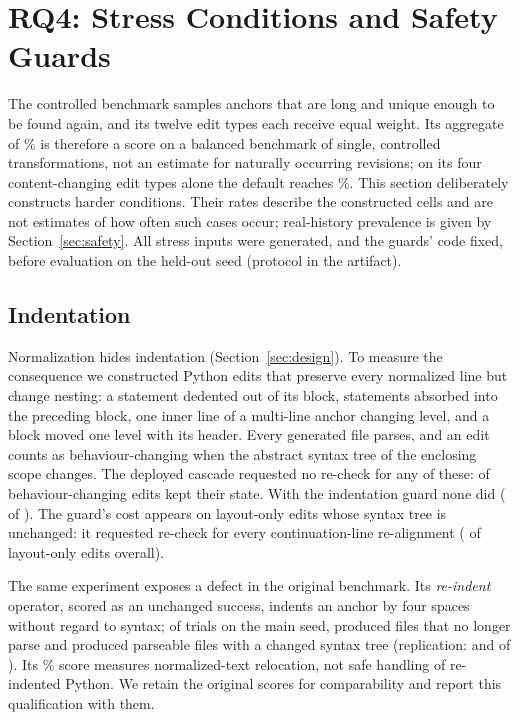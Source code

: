 \section{RQ4: Stress Conditions and Safety Guards}\label{sec:stress}
The controlled benchmark samples anchors that are long and unique enough to be found again, and its twelve edit types each receive equal weight. Its aggregate of \smCtlCasAccPct\% is therefore a score on a balanced benchmark of single, controlled transformations, not an estimate for naturally occurring revisions; on its four content-changing edit types alone the default reaches \ctlChangedAccPct\%. This section deliberately constructs harder conditions. Their rates describe the constructed cells and are not estimates of how often such cases occur; real-history prevalence is given by Section~\ref{sec:safety}. All stress inputs were generated, and the guards' code fixed, before evaluation on the held-out seed (protocol in the artifact).

\subsection{Indentation}
Normalization hides indentation (Section~\ref{sec:design}). To measure the consequence we constructed Python edits that preserve every normalized line but change nesting: a statement dedented out of its block, statements absorbed into the preceding block, one inner line of a multi-line anchor changing level, and a block moved one level with its header. Every generated file parses, and an edit counts as behaviour-changing when the abstract syntax tree of the enclosing scope changes. The deployed cascade requested no re-check for any of these: \bIndentMissDeployed{} of \bIndentSemanticN{} behaviour-changing edits kept their state. With the indentation guard none did (\bIndentMissIG{} of \bIndentSemanticN{}). The guard's cost appears on layout-only edits whose syntax tree is unchanged: it requested re-check for every continuation-line re-alignment (\bIndentFalseIG{} of \bIndentLayoutN{} layout-only edits overall).

The same experiment exposes a defect in the original benchmark. Its \emph{re-indent} operator, scored as an unchanged success, indents an anchor by four spaces without regard to syntax; of \BOriginalIndentTotalMain{} trials on the main seed, \BOriginalIndentInvalidMain{} produced files that no longer parse and \BOriginalIndentASTChangedMain{} produced parseable files with a changed syntax tree (replication: \BOriginalIndentInvalidReplication{} and \BOriginalIndentASTChangedReplication{} of \BOriginalIndentTotalReplication{}). Its \casReindent\% score measures normalized-text relocation, not safe handling of re-indented Python. We retain the original scores for comparability and report this qualification with them.

